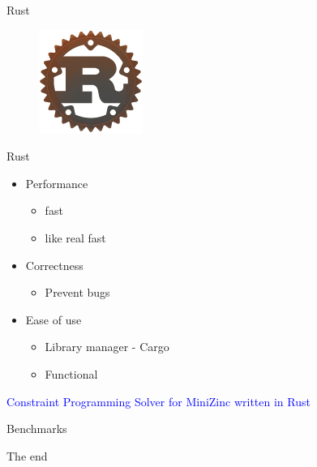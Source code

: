 \documentclass[mathserif,table]{gkibeamer-aaai}
\begin{document}
\begin{frame}{Rust}
	\begin{figure}[ht]
		\includegraphics[scale=0.6]{./figures/rust_logo.png}
	\end{figure}
\end{frame}

\begin{frame}{Rust}
	\begin{itemize}
		\item Performance
		      \begin{itemize}
			      \item fast
			      \item like real fast
		      \end{itemize}
		\item Correctness
		      \begin{itemize}
			      \item Prevent bugs
		      \end{itemize}
		      \pause
		\item Ease of use
		      \begin{itemize}
			      \pause
			      \item Library manager - Cargo
			            \pause
			      \item Functional
		      \end{itemize}
	\end{itemize}
\end{frame}

\begin{frame}
	\begin{center}
		\LARGE{\textcolor{blue}{Constraint Programming Solver for MiniZinc written in Rust}}
	\end{center}
\end{frame}

\begin{frame}
	\begin{center}
		\huge{Benchmarks}
	\end{center}
\end{frame}

\begin{frame}
	\begin{center}
		\huge{
			The end
		}
	\end{center}
\end{frame}
\end{document}
